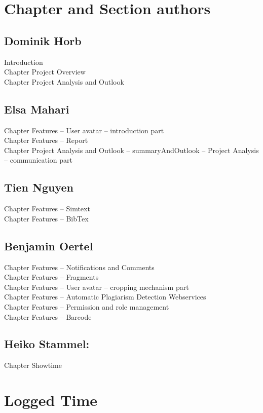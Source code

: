 \begin{appendix}



\chapter{Chapter and Section authors}

\section{Dominik Horb}
Introduction \\
Chapter Project Overview \\
Chapter Project Analysis and Outlook

\section{Elsa Mahari}
Chapter Features -- User avatar – introduction part\\
Chapter Features -- Report\\
Chapter Project Analysis and Outlook -- summaryAndOutlook -- Project Analysis -- communication part

\section{Tien Nguyen}
Chapter Features -- Simtext\\
Chapter Features -- BibTex

\section{Benjamin Oertel}
Chapter Features -- Notifications and Comments\\
Chapter Features -- Fragments\\
Chapter Features -- User avatar – cropping mechanism part \\
Chapter Features -- Automatic Plagiarism Detection Webservices \\
Chapter Features -- Permission and role management \\
Chapter Features -- Barcode

\section{Heiko Stammel:}
Chapter Showtime \\


\chapter{Logged Time}


\end{appendix}
